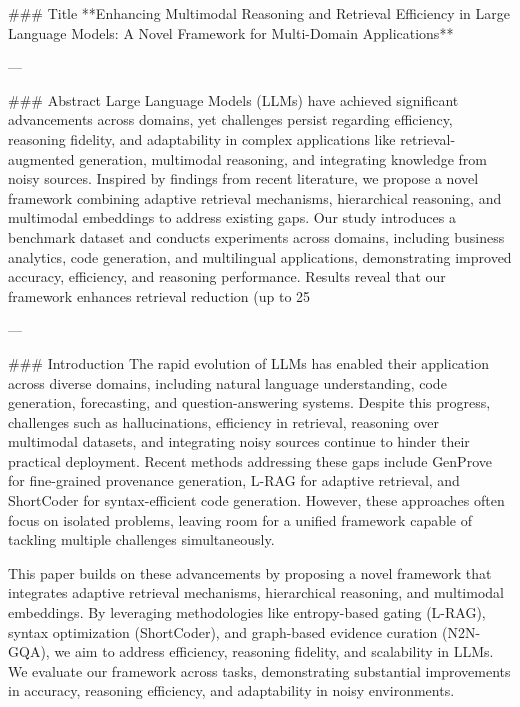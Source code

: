 ### Title  
**Enhancing Multimodal Reasoning and Retrieval Efficiency in Large Language Models: A Novel Framework for Multi-Domain Applications**

---

### Abstract  
Large Language Models (LLMs) have achieved significant advancements across domains, yet challenges persist regarding efficiency, reasoning fidelity, and adaptability in complex applications like retrieval-augmented generation, multimodal reasoning, and integrating knowledge from noisy sources. Inspired by findings from recent literature, we propose a novel framework combining adaptive retrieval mechanisms, hierarchical reasoning, and multimodal embeddings to address existing gaps. Our study introduces a benchmark dataset and conducts experiments across domains, including business analytics, code generation, and multilingual applications, demonstrating improved accuracy, efficiency, and reasoning performance. Results reveal that our framework enhances retrieval reduction (up to 25%

---

### Introduction  
The rapid evolution of LLMs has enabled their application across diverse domains, including natural language understanding, code generation, forecasting, and question-answering systems. Despite this progress, challenges such as hallucinations, efficiency in retrieval, reasoning over multimodal datasets, and integrating noisy sources continue to hinder their practical deployment. Recent methods addressing these gaps include GenProve for fine-grained provenance generation, L-RAG for adaptive retrieval, and ShortCoder for syntax-efficient code generation. However, these approaches often focus on isolated problems, leaving room for a unified framework capable of tackling multiple challenges simultaneously.

This paper builds on these advancements by proposing a novel framework that integrates adaptive retrieval mechanisms, hierarchical reasoning, and multimodal embeddings. By leveraging methodologies like entropy-based gating (L-RAG), syntax optimization (ShortCoder), and graph-based evidence curation (N2N-GQA), we aim to address efficiency, reasoning fidelity, and scalability in LLMs. We evaluate our framework across tasks, demonstrating substantial improvements in accuracy, reasoning efficiency, and adaptability in noisy environments.

